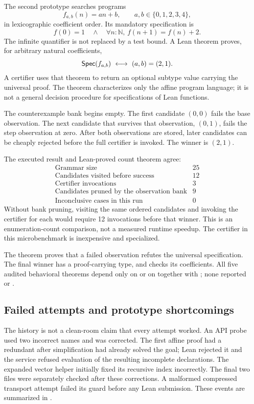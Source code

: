 The second prototype searches programs
\[
 f_{a,b}(n)=an+b,\qquad a,b\in\{0,1,2,3,4\},
\]
in lexicographic coefficient order. Its mandatory specification is
\[
 f(0)=1\quad\land\quad\forall n:\mathbb N,\ f(n+1)=f(n)+2.
\]
The infinite quantifier is not replaced by a test bound. A Lean theorem proves, for arbitrary natural coefficients,
\[
 \Spec(f_{a,b})\ \longleftrightarrow\ (a,b)=(2,1).
\]
A certifier uses that theorem to return an optional subtype value carrying the universal proof. The theorem characterizes only the affine program language; it is not a general decision procedure for specifications of Lean functions.

The counterexample bank begins empty. The first candidate $(0,0)$ fails the base observation. The next candidate that survives that observation, $(0,1)$, fails the step observation at zero. After both observations are stored, later candidates can be cheaply rejected before the full certifier is invoked. The winner is $(2,1)$.

The executed result and Lean-proved count theorem agree:
\[
\begin{array}{c|r}
\text{Grammar size} & 25\\
\text{Candidates visited before success} & 12\\
\text{Certifier invocations} & 3\\
\text{Candidates pruned by the observation bank} & 9\\
\text{Inconclusive cases in this run} & 0
\end{array}
\]
Without bank pruning, visiting the same ordered candidates and invoking the certifier for each would require 12 invocations before that winner. This is an enumeration-count comparison, not a measured runtime speedup. The certifier in this microbenchmark is inexpensive and specialized.

The  theorem proves that a failed observation refutes the universal specification. The final winner has a proof-carrying type, and  checks its coefficients. All five audited behavioral theorems depend only on  or on  together with ; none reported  or .

\subsection{Failed attempts and prototype shortcomings}

The history is not a clean-room claim that every attempt worked. An API probe used two incorrect names and was corrected. The first affine proof had a redundant  after simplification had already solved the goal; Lean rejected it and the service refused evaluation of the resulting incomplete declarations. The expanded vector helper initially fixed its recursive index incorrectly. The final two files were separately checked after these corrections. A malformed compressed transport attempt failed its guard before any Lean submission. These events are summarized in .

